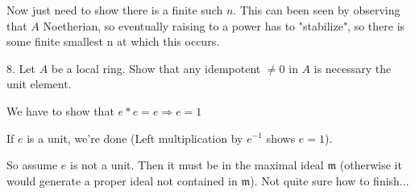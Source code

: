 \documentclass{article}
\begin{document}
Now just need to show there is a finite such $n$. This can been seen by observing that $A$ Noetherian, so eventually raising to a power has to "stabilize", so there is some finite smallest n at which this occurs.

\break
\break

8. Let $A$ be a local ring. Show that any idempotent $\ne 0$ in $A$ is necessary the unit element. 

We have to show that $e * e = e \Rightarrow e = 1$

If $e$ is a unit, we're done (Left multiplication by $e^{-1}$ shows $e = 1$).

So assume $e$ is not a unit. Then it must be in the maximal ideal $\mathfrak{m}$ (otherwise it would generate a proper ideal not contained in $\mathfrak{m}$). Not quite sure how to finish...
\end{document}
